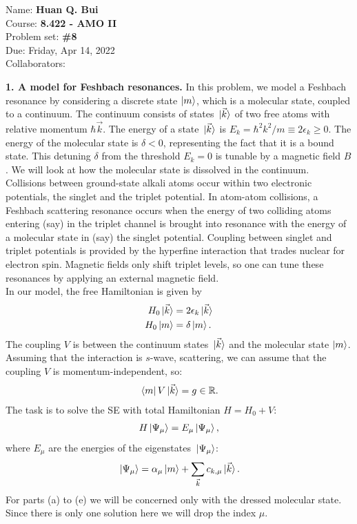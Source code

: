 \documentclass{article}
\theoremstyle{definition}
\newcommand{\al}{\alpha}
\begin{document}
\begin{framed}
\noindent Name: \textbf{Huan Q. Bui}\\
Course: \textbf{8.422 - AMO II}\\
Problem set: \textbf{\#8}\\
Due: Friday, Apr 14, 2022\\
Collaborators:  
\end{framed}
	


\noindent \textbf{1. A model for Feshbach resonances.} In this problem, we model a Feshbach resonance by considering a discrete state $\ket{m}$, which is a molecular state, coupled to a continuum. The continuum consists of states $\ket*{\vec{k}}$ of two free atoms with relative momentum $\hbar \vec{k}$. The energy of a state $\ket*{\vec{k}}$ is $E_k = \hbar^2 k^2 / m \equiv 2\epsilon_k \geq 0$. The energy of the molecular state is $\delta < 0$, representing the fact that it is a bound state. This detuning $\delta$ from the threshold $E_k = 0$ is tunable by a magnetic field $B$.  We will look at how the molecular state is dissolved in the continuum. \\

\noindent Collisions between ground-state alkali atoms occur within two electronic potentials, the singlet and the triplet potential. In atom-atom collisions, a Feshbach scattering resonance occurs when the energy of two colliding atoms entering (say) in the triplet channel is brought into resonance with the energy of a molecular state in (say) the singlet potential. Coupling between singlet and triplet potentials is provided by the hyperfine interaction that trades nuclear for electron spin. Magnetic fields only shift triplet levels, so one can tune these resonances by applying an external magnetic field. \\

In our model, the free Hamiltonian is given by 
\begin{align*}
H_0 \ket*{\vec{k}} &= 2 \epsilon_k \ket*{\vec{k}}  \\
H_0 \ket*{m} &= \delta \ket*{m}.
\end{align*}
The coupling $V$ is between the continuum states $\ket*{\vec{k}}$ and the molecular state $\ket{m}$. Assuming that the interaction is $s$-wave, scattering, we can assume that the coupling $V$ is momentum-independent, so:
\begin{align*}
\bra*{m} V \ket*{\vec{k}} = g \in \mathbb{R}. 
\end{align*}
The task is to solve the SE with total Hamiltonian $H = H_0 + V$:
\begin{align*}
H \ket*{\Psi_\mu} = E_\mu \ket*{\Psi_\mu},
\end{align*}
where $E_\mu$ are the energies of the eigenstates $\ket*{\Psi_\mu}$:
\begin{align*}
\ket*{\Psi_\mu} = \al_\mu \ket{m} + \sum_{\vec{k}} c_{{k}, \mu} \ket*{\vec{k}}. 
\end{align*}
For parts (a) to (e) we will be concerned only with the dressed molecular state. Since there is only one solution here we will drop the index $\mu$. 
\end{document}

